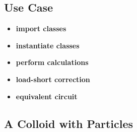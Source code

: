 % 

\subsection{Use Case}

 \begin{itemize}
	\item \textbf{import classes}
\end{itemize}

% 

 \begin{itemize}
	\item \textbf{instantiate classes}
\end{itemize}

% 

 \begin{itemize}
	\item \textbf{perform calculations}
\end{itemize}

% 

 \begin{itemize}
	\item \textbf{load-short correction}
\end{itemize}

% 

 \begin{itemize}
	\item \textbf{equivalent circuit}
\end{itemize}

% 

\subsection{A Colloid with Particles}

